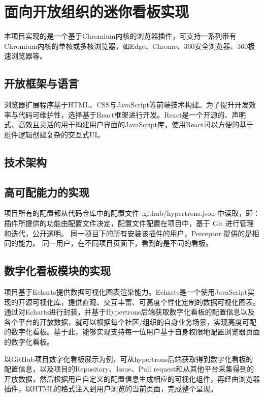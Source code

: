 \section{面向开放组织的迷你看板实现}
\par 本项目实现的是一个基于Chromium内核的浏览器插件，可支持一系列带有Chromium内核的单核或多核浏览器，如Edge、Chrome、360安全浏览器、360极速浏览器等。

\subsection{开放框架与语言}
\par 浏览器扩展程序基于HTML、CSS与JavaScript等前端技术构建。为了提升开发效率与代码可维护性，选择基于React框架进行开发。React是一个开源的、声明式、高效且灵活的用于构建用户界面的JavaScript库，使用React可以方便的基于组件逻辑创建复杂的交互式UI。
\subsection{技术架构}


\subsection{高可配能力的实现}
\par 项目所有的配置都从代码仓库中的配置文件 .github/hypertrons.json 中读取，即：
插件所提供的功能由配置文件决定，配置文件配置在项目中，基于 Git 进行管理和迭代，公开透明。
同一项目下的所有安装该插件的用户，Perceptor 提供的是相同的能力。
同一用户，在不同项目页面下，看到的是不同的看板。


\subsection{数字化看板模块的实现}
\par 项目基于Echarts提供数据可视化图表渲染能力。Echarts是一个使用JavaScript实现的开源可视化库，提供直观、交互丰富、可高度个性化定制的数据可视化图表。通过对Echarts进行封装，并基于Hypertrons后端获取数字化看板的配置信息以及各个平台的开放数据，就可以根据每个社区/组织的自身业务场景，实现高度可配的数字化看板。基于此，能够实现支持每一位用户基于自身权限地配置浏览器页面的数字化看板。
\par 以GitHub项目数字化看板展示为例，可从hypertrons后端获取得到数字化看板的配置信息，以及项目的Repository、Issue、Pull request和从其他平台采集得到的开放数据，然后根据用户自定义的配置信息生成相应的可视化组件，再经由浏览器插件，以HTML的格式注入到用户浏览的当前页面，完成整个呈现。



